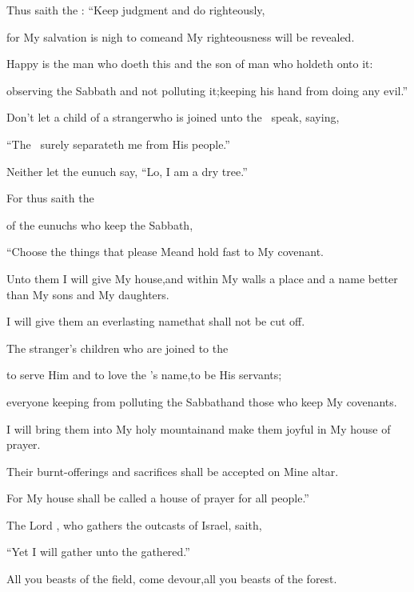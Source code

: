 
\begin{inparaenum}
  \pa{} Thus saith the \lord: ``Keep judgment and do righteously,%

  \pb{}for My salvation is nigh to come\pa{}and My righteousness will be revealed.%

  \pb{} Happy is the man who doeth this%
  \pa{}and the son of man who holdeth onto it:%

  \pb{}observing the Sabbath and not polluting it;\pa{}keeping his hand from doing any evil.''%

  \pb{} Don't let a child of a stranger\pa{}who is joined unto the \lord\ speak, saying,%

  \pb{}``The \lord\ surely separateth me from His people.''%

  \pb{}Neither let the eunuch say, ``Lo, I am a dry tree.''%

  \pb{} For thus saith the \lord%

  \pb{}of the eunuchs who keep the Sabbath,%

  \pb{}``Choose the things that please Me\pa{}and hold fast to My covenant.%

  \pb{} Unto them I will give My house,\pa{}and within My walls a place and a name better than My sons and My daughters.%

  \pb{}I will give them an everlasting name\pa{}that shall not be cut off.%

  \pb{} The stranger's children who are joined to the \lord%

  \pb{}to serve Him and to love the \lord's name,\pa{}to be His servants;%

  \pb{}everyone keeping from polluting the Sabbath\pa{}and those who keep My covenants.%

  \pb{} I will bring them into My holy mountain\pa{}and make them joyful in My house of prayer.%

  \pb{}Their burnt-offerings and sacrifices shall be accepted on Mine altar.%

  \pb{}For My house shall be called a house of prayer for all people.''%

  \pb{} The Lord \lord,%
  \pa{}who gathers the outcasts of Israel, saith,%

  \pb{}``Yet I will gather unto the gathered.''%

  \pa{} All you beasts of the field, come devour,\pa{}all you beasts of the forest.%
\end{inparaenum}
